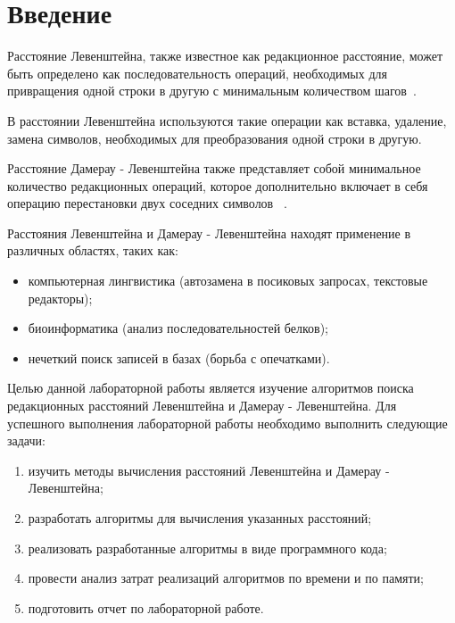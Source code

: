\chapter*{Введение}

Расстояние Левенштейна, также известное как редакционное расстояние, может быть определено как последовательность операций, необходимых для привращения одной строки в другую с минимальным количеством шагов~\cite{levenshtein}. 

В расстоянии Левенштейна используются такие операции как вставка, удаление, замена символов, необходимых для преобразования одной строки в другую. 

Расстояние Дамерау - Левенштейна также представляет собой минимальное количество редакционных операций, которое дополнительно включает в себя операцию перестановки двух соседних символов~\cite{ulianov} .

Расстояния Левенштейна и Дамерау - Левенштейна находят применение в различных областях, таких как: 
\begin{itemize}
	\item компьютерная лингвистика (автозамена в посиковых запросах, текстовые редакторы);
	\item биоинформатика (анализ последовательностей белков);
	\item нечеткий поиск записей в базах (борьба с опечатками).
\end{itemize}

Целью данной лабораторной работы является изучение алгоритмов поиска редакционных расстояний Левенштейна и Дамерау - Левенштейна. 
Для успешного выполнения лабораторной работы необходимо выполнить следующие задачи: 
\begin{enumerate}[label={\arabic*)}]
	\item изучить методы вычисления расстояний Левенштейна и Дамерау - Левенштейна;
	\item разработать алгоритмы для вычисления указанных расстояний;
	\item реализовать разработанные алгоритмы в виде программного кода;
	\item провести анализ затрат реализаций алгоритмов по времени и по памяти;
	\item подготовить отчет по лабораторной работе.
\end{enumerate}